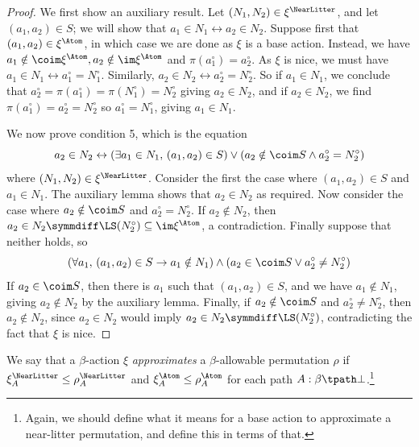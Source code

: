 \begin{proof}
  We first show an auxiliary result.
  Let \( (N_1, N_2) \in \xi^\NearLitter \), and let \( (a_1, a_2) \in S \); we will show that \( a_1 \in N_1 \leftrightarrow a_2 \in N_2 \).
  Suppose first that \( (a_1, a_2) \in \xi^\Atom \), in which case we are done as \( \xi \) is a base action.
  Instead, we have \( a_1 \notin \coim \xi^\Atom, a_2 \notin \im \xi^\Atom \) and \( \pi(a_1^\circ) = a_2^\circ \).
  As \( \xi \) is nice, we must have \( a_1 \in N_1 \leftrightarrow a_1^\circ = N_1^\circ \).
  Similarly, \( a_2 \in N_2 \leftrightarrow a_2^\circ = N_2^\circ \).
  So if \( a_1 \in N_1 \), we conclude that \( a_2^\circ = \pi(a_1^\circ) = \pi(N_1^\circ) = N_2^\circ \) giving \( a_2 \in N_2 \), and if \( a_2 \in N_2 \), we find \( \pi(a_1^\circ) = a_2^\circ = N_2^\circ \) so \( a_1^\circ = N_1^\circ \), giving \( a_1 \in N_1 \).

  We now prove condition 5, which is the equation
  \[ a_2 \in N_2 \leftrightarrow (\exists a_1 \in N_1,\, (a_1, a_2) \in S) \vee (a_2 \notin \coim S \wedge a_2^\circ = N_2^\circ) \]
  where \( (N_1, N_2) \in \xi^\NearLitter \).
  Consider the first the case where \( (a_1, a_2) \in S \) and \( a_1 \in N_1 \).
  The auxiliary lemma shows that \( a_2 \in N_2 \) as required.
  Now consider the case where \( a_2 \notin \coim S \) and \( a_2^\circ = N_2^\circ \).
  If \( a_2 \notin N_2 \), then \( a_2 \in N_2 \symmdiff \LS(N_2^\circ) \subseteq \im \xi^\Atom \), a contradiction.
  Finally suppose that neither holds, so
  \[ (\forall a_1,\, (a_1, a_2) \in S \to a_1 \notin N_1) \wedge (a_2 \in \coim S \vee a_2^\circ \neq N_2^\circ) \]
  If \( a_2 \in \coim S \), then there is \( a_1 \) such that \( (a_1, a_2) \in S \), and we have \( a_1 \notin N_1 \), giving \( a_2 \notin N_2 \) by the auxiliary lemma.
  Finally, if \( a_2 \notin \coim S \) and \( a_2^\circ \neq N_2^\circ \), then \( a_2 \notin N_2 \), since \( a_2 \in N_2 \) would imply \( a_2 \in N_2 \symmdiff \LS(N_2^\circ) \), contradicting the fact that \( \xi \) is nice.
\end{proof}
\begin{definition}[approximates]
  \label{def:StrAction.Approximates}
  We say that a \( \beta \)-action \( \xi \) \emph{approximates} a \( \beta \)-allowable permutation \( \rho \) if \( \xi_A^\NearLitter \leq \rho_A^\NearLitter \) and \( \xi_A^\Atom \leq \rho_A^\Atom \) for each path \( A : \beta \tpath \bot \).\footnote{Again, we should define what it means for a base action to approximate a near-litter permutation, and define this in terms of that.}
\end{definition}
